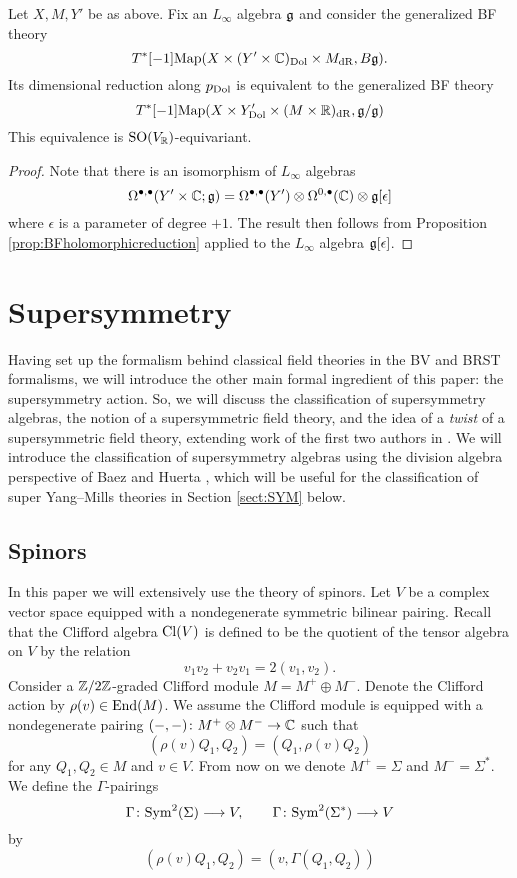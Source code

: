 \documentclass[10pt, oneside]{article}
\begin{document}
\begin{prop}
\label{prop:BFdolbeaultreduction}
Let $X, M, Y'$ be as above.
Fix an $L_\infty$ algebra $\mathfrak g$ and consider the generalized BF theory
\[
T^*[-1] {\rm Map}(X \times (Y' \times \mathbb C)_{\rm Dol} \times M_{\rm dR} , B \mathfrak g) .
\]
Its dimensional reduction along $p_{\rm Dol}$ is equivalent to the generalized BF theory
\[
T^*[-1] {\rm Map} (X \times Y'_{\rm Dol} \times (M \times \mathbb R)_{\rm dR}, \mathfrak g / \mathfrak g)
\]
This equivalence is $\mathrm{SO}(V_\mathbb R)$-equivariant.
\end{prop}
\begin{proof}
Note that there is an isomorphism of $L_\infty$ algebras
\[
\Omega^{\bullet, \bullet} (Y' \times \mathbb C ; \mathfrak g) = \Omega^{\bullet,\bullet}(Y') \otimes \Omega^{0,\bullet}(\mathbb C) \otimes \mathfrak g[\epsilon]
\]
where $\epsilon$ is a parameter of degree $+1$.
The result then follows from Proposition \ref{prop:BFholomorphicreduction} applied to the $L_\infty$ algebra $\mathfrak g[\epsilon]$. 
\end{proof}

\section{Supersymmetry} \label{sect:susy}
Having set up the formalism behind classical field theories in the BV and BRST formalisms, we will introduce the other main formal ingredient of this paper: the supersymmetry action.  So, we will discuss the classification of supersymmetry algebras, the notion of a supersymmetric field theory, and the idea of a \emph{twist} of a supersymmetric field theory, extending work of the first two authors in \cite{ElliottSafronov}.  We will introduce the classification of supersymmetry algebras using the division algebra perspective of Baez and Huerta \cite{BaezHuerta}, which will be useful for the classification of super Yang--Mills theories in Section \ref{sect:SYM} below.

\subsection{Spinors}
\label{sect:spinors}

In this paper we will extensively use the theory of spinors. Let $V$ be a complex vector space equipped with a nondegenerate symmetric bilinear pairing. Recall that the Clifford algebra $\mathrm{Cl}(V)$ is defined to be the quotient of the tensor algebra on $V$ by the relation
\[v_1 v_2 + v_2 v_1 = 2(v_1, v_2).\]
Consider a $\mathbb Z/2\mathbb Z$-graded Clifford module $M=M^+\oplus M^-$. Denote the Clifford action by $\rho(v)\in\operatorname{End}(M)$. We assume the Clifford module is equipped with a nondegenerate pairing $(-, -)\colon M^+\otimes M^-\rightarrow \mathbb C$ such that
\[(\rho(v) Q_1, Q_2) = (Q_1, \rho(v) Q_2)\]
for any $Q_1, Q_2\in M$ and $v\in V$. From now on we denote $M^+=\Sigma$ and $M^-=\Sigma^*$. We define the $\Gamma$-pairings
\[\Gamma\colon{\rm Sym}^2(\Sigma)\longrightarrow V,\qquad \Gamma\colon{\rm Sym}^2(\Sigma^*)\longrightarrow V\]
by
\begin{equation}
(\rho(v) Q_1, Q_2) = (v, \Gamma(Q_1, Q_2))
\label{eq:Gammaspinorpairing}
\end{equation}
\end{document}

